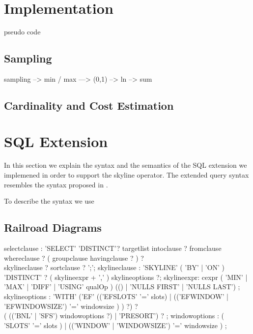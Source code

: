 \section{Implementation}
pseudo code

\subsection{Sampling}

sampling --> min / max  ---> (0,1) --> ln   --> sum

\subsection{Cardinality and Cost Estimation}


\section{SQL Extension}

In this section we explain the syntax and the semantics of the SQL
extension we implemened in order to support the skyline operator. The
extended query syntax resembles the syntax proposed in
\citep{Borzsonyi2001}.

To describe the syntax we use 
\subsection{Railroad Diagrams}


\railtermfont{\ttfamily\upshape\tiny}
\railboxheight 12pt
\railinit

\begin{rail}

selectclause : 'SELECT' 'DISTINCT'? targetlist intoclause ? fromclause \\ whereclause ? ( groupclause havingclause ? ) ? \\ skylineclause ? sortclause ? ';';
skylineclause : 'SKYLINE' ( 'BY' | 'ON' ) 'DISTINCT' ? ( skylineexpr + ',' ) skylineoptions ?;
skylineexpr: cexpr ( 'MIN' | 'MAX' | 'DIFF' | 'USING' qualOp ) (() | 'NULLS FIRST' | 'NULLS LAST') ;
skylineoptions : 'WITH' ('EF' (('EFSLOTS' '=' slots) | (('EFWINDOW' | 'EFWINDOWSIZE') '=' windowsize ) ) ?) ? \\ ( (('BNL' | 'SFS') windowoptions ?) | 'PRESORT') ? ;
windowoptions : ( 'SLOTS' '=' slots ) | (('WINDOW' | 'WINDOWSIZE') '=' windowsize ) ;

\end{rail}


